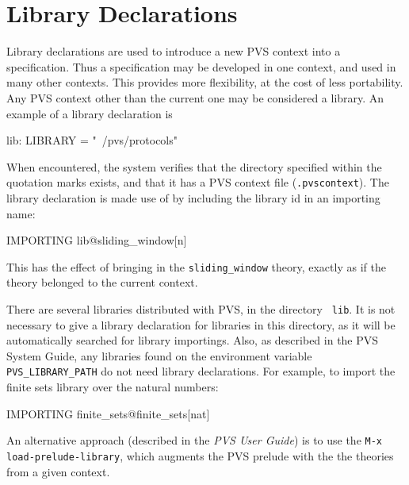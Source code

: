 \section{Library Declarations}
\label{library-decls}

Library declarations are used to introduce a new PVS context into a
specification.  Thus a specification may be developed in one context, and
used in many other contexts.  This provides more flexibility, at the cost
of less portability.  Any PVS context other than the current one may be
considered a library.  An example of a library declaration
is
\begin{pvsex}
  lib: LIBRARY = "~/pvs/protocols"
\end{pvsex}
When encountered, the system verifies that the directory specified within
the quotation marks exists, and that it has a PVS context file
%
(\texttt{.pvscontext}).  The library declaration is made use of by
including the library id in an importing name:
\begin{pvsex}
  IMPORTING lib@sliding_window[n]
\end{pvsex}
This has the effect of bringing in the \texttt{sliding\_window} theory,
exactly as if the theory belonged to the current context.

There are several libraries distributed with PVS, in the directory {\tt
lib}.  It is not necessary to give a library declaration for libraries in
this directory, as it will be automatically searched for library
importings.  Also, as described in the PVS System Guide, any libraries
found on the environment variable \texttt{PVS\_LIBRARY\_PATH} do not need
library declarations.  For example, to import the finite sets library over
the natural numbers:
\begin{pvsex}
  IMPORTING finite\_sets@finite\_sets[nat]
\end{pvsex}
An alternative approach (described in the \emph{PVS User
Guide}\cite{PVS:userguide}) is to use the {\tt M-x load-prelude-library},
which augments the PVS prelude with the the theories from a given context.

